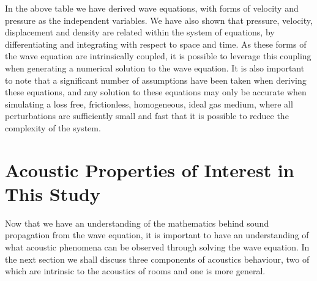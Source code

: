 In the above table we have derived wave equations, with forms of velocity and pressure as the independent variables. We have also shown that pressure, velocity, displacement and density are related within the system of equations, by differentiating and integrating with respect to space and time. As these forms of the wave equation are intrinsically coupled, it is possible to leverage this coupling when generating a numerical solution to the wave equation. It is also important to note that a significant number of assumptions have been taken when deriving these equations, and any solution to these equations may only be accurate when simulating a loss free, frictionless, homogeneous, ideal gas medium, where all perturbations are sufficiently small and fast that it is possible to reduce the complexity of the system.\\

\section{Acoustic Properties of Interest in This Study}
Now that we have an understanding of the mathematics behind sound propagation from the wave equation, it is important to have an understanding of what acoustic phenomena can be observed through solving the wave equation. In the next section we shall discuss three components of acoustics behaviour, two of which are intrinsic to the acoustics of rooms and one is more general.\\

